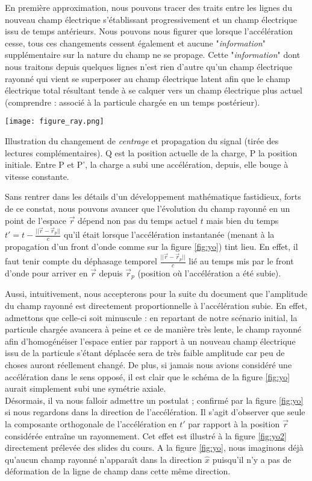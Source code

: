En première approximation, nous pouvons tracer des traits entre les lignes du nouveau champ électrique s'établissant progressivement et un champ électrique issu de temps antérieurs. Nous pouvons nous figurer que lorsque l'accélération cesse, tous ces changements cessent également et aucune "\textit{information}" supplémentaire sur la nature  du champ ne se propage. Cette "\textit{information}" dont nous traitons depuis quelques lignes n'est rien d'autre qu'un champ électrique rayonné qui vient se superposer au champ électrique latent afin que le champ électrique total résultant tende à se calquer vers un champ électrique plus actuel (comprendre : associé à la particule chargée en un temps postérieur). 
\begin{marginfigure}
	\centering
	\texttt{[image: figure\_ray.png]}
	\caption{Illustration du changement de \textit{centrage} et propagation du signal (tirée des lectures complémentaires). Q est la position actuelle de la charge, P la position initiale. Entre P et P', la charge a subi une accélération, depuis, elle bouge à vitesse constante.}%
	\label{fig:yo}
\end{marginfigure}

Sans rentrer dans les détails d'un développement mathématique fastidieux, forts de ce constat, nous pouvons avancer que l'évolution du champ rayonné en un point de l'espace $\vec{r}$ dépend non pas du temps actuel $t$ mais bien du temps $t' = t - \frac{|| \vec{r} - \vec{r}_{p} ||}{c}$ qu'il était lorsque l'accélération instantanée (menant à la propagation d'un front d'onde comme sur la figure \ref{fig:yo}) tint lieu. En effet, il faut tenir compte du déphasage temporel $\frac{||\vec{r} - \vec{r}_{p} ||}{c}$ lié au temps mis par le front d'onde pour arriver en $\vec{r}$ depuis $\vec{r}_{p}$ (position où l'accélération a été subie).

Aussi, intuitivement, nous accepterons pour la suite du document que l'amplitude du champ rayonné est directement proportionnelle à l'accélération subie. En effet, admettons que celle-ci soit minuscule : en repartant de notre scénario initial, la particule chargée avancera à peine et ce de manière très lente, le champ rayonné afin d'homogénéiser l'espace entier par rapport à un nouveau champ électrique issu de la particule s'étant déplacée sera de très faible amplitude car peu de choses auront réellement changé. De plus, si jamais nous avions considéré une accélération dans le sens opposé, il est clair que le schéma de la figure \ref{fig:yo} aurait simplement subi une symétrie axiale.\\ Désormais, il va nous falloir admettre un postulat ; confirmé par la figure \ref{fig:yo} si nous regardons dans la direction de l'accélération. Il s'agit d'observer que seule la composante orthogonale de l'accélération en $t'$ par rapport à la position $\vec{r}$ considérée entraîne un rayonnement. Cet effet est illustré à la figure \ref{fig:yo2} directement prélevée des slides du cours. A la figure \ref{fig:yo}, nous imaginons déjà qu'aucun champ rayonné n'apparaît dans la direction $\hat{x}$ puisqu'il n'y a pas de déformation de la ligne de champ dans cette même direction.

